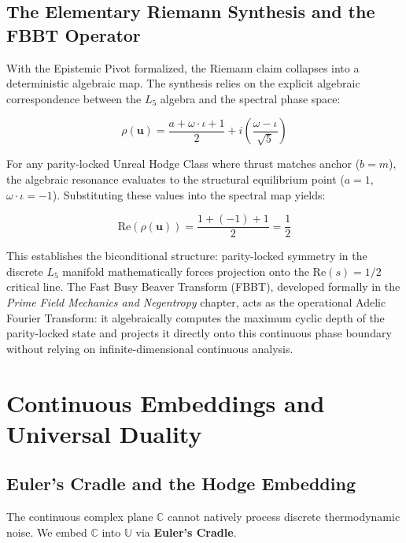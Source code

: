 \documentclass[12pt,oneside]{article}
\theoremstyle{principia}
\theoremstyle{definition}
\theoremstyle{remark}
\providecommand{\UU}{\mathbb{U}}
\providecommand{\CC}{\mathbb{C}}
\begin{document}
\subsection{The Elementary Riemann Synthesis and the FBBT Operator}

With the Epistemic Pivot formalized, the Riemann claim collapses into a deterministic algebraic map. The synthesis relies on the explicit algebraic correspondence between the $L_5$ algebra and the spectral phase space:

\begin{equation}
\rho(\mathbf{u}) = \frac{a + \omega \cdot \iota + 1}{2} + i \left( \frac{\omega - \iota}{\sqrt{5}} \right)
\end{equation}

For any parity-locked Unreal Hodge Class where thrust matches anchor ($b=m$), the algebraic resonance evaluates to the structural equilibrium point ($a=1$, $\omega \cdot \iota = -1$). Substituting these values into the spectral map yields:

\begin{equation}
\text{Re}(\rho(\mathbf{u})) = \frac{1 + (-1) + 1}{2} = \frac{1}{2}
\end{equation}

This establishes the biconditional structure: parity-locked symmetry in the discrete $L_5$ manifold mathematically forces projection onto the $\text{Re}(s) = 1/2$ critical line. The Fast Busy Beaver Transform (FBBT), developed formally in the \emph{Prime Field Mechanics and Negentropy} chapter, acts as the operational Adelic Fourier Transform: it algebraically computes the maximum cyclic depth of the parity-locked state and projects it directly onto this continuous phase boundary without relying on infinite-dimensional continuous analysis.

\section{Continuous Embeddings and Universal Duality}

\subsection{Euler's Cradle and the Hodge Embedding}

The continuous complex plane $\CC$ cannot natively process discrete thermodynamic noise. We embed $\CC$ into $\UU$ via \textbf{Euler's Cradle}.
\end{document}
